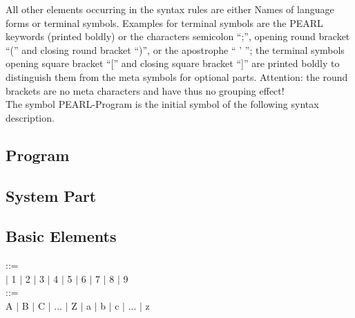 All other elements occurring in the syntax rules are either Names of language
forms or terminal symbols. Examples for terminal symbols are the PEARL
keywords (printed boldly) or the characters semicolon ``;'', opening round
bracket ``('' and closing round bracket ``)'', 
or the apostrophe `` ' ''; the terminal symbols opening square bracket ``[''
and closing square bracket ``]'' are printed boldly to distinguish them
from the meta symbols for optional parts. Attention: the round brackets are
no meta characters and have thus no grouping effect!\\

The symbol PEARL-Program is the initial symbol of the following syntax
description.

\subsection{Program}    %





\subsection{System Part}   %















\subsection{Basic Elements}    %

 ::=\\
 $\mid$ 1 $\mid$ 2 $\mid$ 3 $\mid$ 4 $\mid$ 5 $\mid$ 6 $\mid$ 7 $\mid$ 8 $\mid$ 9\\

 ::= \\
\x A $\mid$ B $\mid$ C $\mid$ ... $\mid$ Z $\mid$ a $\mid$ b $\mid$ c $\mid$ ... $\mid$ z\\

